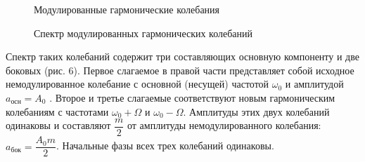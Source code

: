 \documentclass[a4paper,12pt]{article} %
\begin{document}
\begin{enumerate}
		\begin{figure}[h]
			\begin{minipage}[h]{0.5\linewidth}
				\caption{Модулированные гармонические колебания}
			\end{minipage}
			\begin{minipage}[h]{0.5\linewidth}
				\caption{Спектр модулированных гармонических колебаний}
			\end{minipage}
		\end{figure}
		
		Спектр таких колебаний содержит три составляющих  основную
		компоненту и две боковых (рис. 6). Первое слагаемое в правой части представляет собой исходное немодулированное колебание
		с основной (несущей) частотой $\omega_{0}$ и амплитудой $a_{осн} = A_{0}$ . Второе и третье слагаемые соответствуют новым гармоническим колебаниям с частотами $\omega_{0} + \Omega$ и $\omega_{0} - \Omega$. Амплитуды этих двух колебаний одинаковы и составляют $\dfrac{m}{2}$ от амплитуды немодулированного колебания:
		$a_{бок} = \dfrac{A_{0}m}{2}$. Начальные фазы всех трех колебаний одинаковы.
	\end{enumerate}
\end{document}
